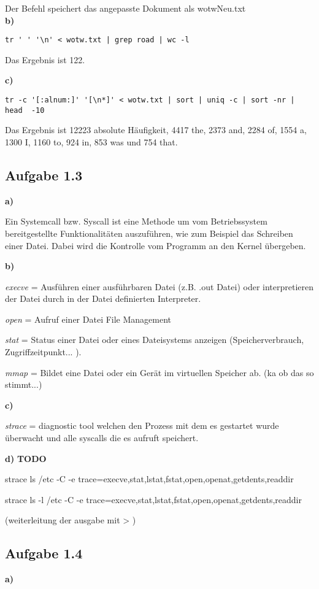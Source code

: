 \documentclass[a4paper,graphics,11pt]{article}
\newcommand{\aufgabe}[1]{\subsection*{Aufgabe #1}}
\begin{document}
Der Befehl speichert das angepasste Dokument als wotwNeu.txt\\


\textbf{b)}

\begin{verbatim}
tr ' ' '\n' < wotw.txt | grep road | wc -l
\end{verbatim}



Das Ergebnis ist 122.

\textbf{c)}

\begin{verbatim}
tr -c '[:alnum:]' '[\n*]' < wotw.txt | sort | uniq -c | sort -nr | head  -10
\end{verbatim}


Das Ergebnis ist 12223 absolute Häufigkeit, 4417 the, 2373 and, 2284 of, 1554 a, 1300 I, 1160 to, 924 in, 853 was und 754 that.

\aufgabe{1.3}
\textbf{a)}

Ein Systemcall bzw. Syscall ist eine Methode um vom Betriebssystem bereitgestellte Funktionalitäten auszuführen, wie zum Beispiel das Schreiben einer Datei. Dabei wird die Kontrolle vom Programm an den Kernel übergeben.

\textbf{b)}

\textit{execve} = Ausführen einer ausführbaren Datei (z.B. .out Datei) oder interpretieren der Datei durch in der Datei definierten Interpreter.

\textit{open} = Aufruf einer Datei File Management

\textit{stat} = Status einer Datei oder eines Dateisystems anzeigen (Speicherverbrauch, Zugriffzeitpunkt... ).

\textit{mmap} = Bildet eine Datei oder ein Gerät im virtuellen Speicher ab. (ka ob das so stimmt...)


\textbf{c)}

\textit{strace} = diagnostic tool welchen den Prozess mit dem es gestartet wurde überwacht und alle syscalls die es aufruft speichert.

\textbf{d)}
\textbf{TODO}

strace ls /etc -C -e trace=execve,stat,lstat,fstat,open,openat,getdents,readdir

strace ls -l /etc -C -e trace=execve,stat,lstat,fstat,open,openat,getdents,readdir

(weiterleitung der ausgabe mit > )

\aufgabe{1.4}

\textbf{a)}
\end{document}
